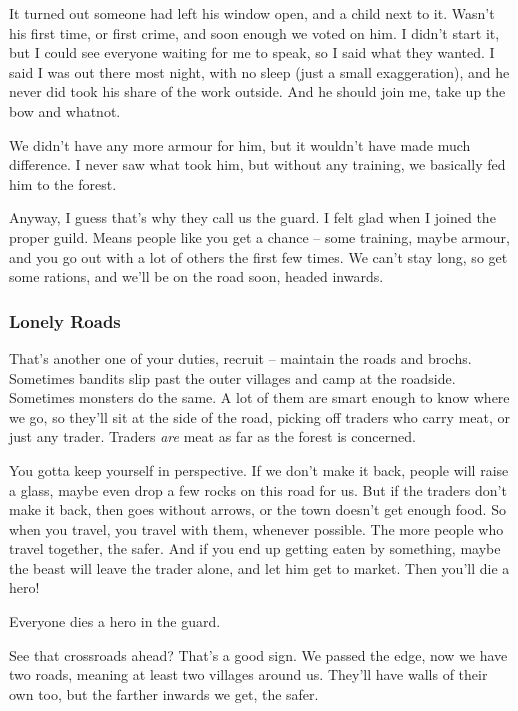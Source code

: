 \begin{multicols}{2}
\begin{exampletext}
  It turned out someone had left his window open, and a child next to it.
  Wasn't his first time, or first crime, and soon enough we voted on him.
  I didn't start it, but I could see everyone waiting for me to speak, so I said what they wanted.
  I said I was out there most night, with no sleep (just a small exaggeration), and he never did took his share of the work outside.
  And he should join me, take up the bow and whatnot.

  We didn't have any more armour for him, but it wouldn't have made much difference.
  I never saw what took him, but without any training, we basically fed him to the forest.
  
  Anyway, I guess that's why they call us the \gls{guard}.
  I felt glad when I joined the proper guild.
  Means people like you get a chance -- some training, maybe armour, and you go out with a lot of others the first few times.
  We can't stay long, so get some rations, and we'll be on the road soon, headed inwards.

  \subsubsection*{Lonely Roads}

  That's another one of your duties, recruit -- maintain the roads and \glspl{broch}.
  Sometimes bandits slip past the outer \glspl{village} and camp at the roadside.
  Sometimes monsters do the same.
  A lot of them are smart enough to know where we go, so they'll sit at the side of the road, picking off traders who carry meat, or just any trader.
  Traders \emph{are} meat as far as the forest is concerned.

  You gotta keep yourself in perspective.
  If we don't make it back, people will raise a glass, maybe even drop a few rocks on this road for us.
  But if the traders don't make it back, then  goes without arrows, or the town doesn't get enough food.
  So when you travel, you travel with them, whenever possible.
  The more people who travel together, the safer.
  And if you end up getting eaten by something, maybe the beast will leave the trader alone, and let him get to market.
  Then you'll die a hero!

  Everyone dies a hero in the \gls{guard}.

  See that crossroads ahead?
  That's a good sign.
  We passed the \gls{edge}, now we have two roads, meaning at least two \glspl{village} around us.
  They'll have walls of their own too, but the farther inwards we get, the safer.


\end{exampletext}
\end{multicols}
